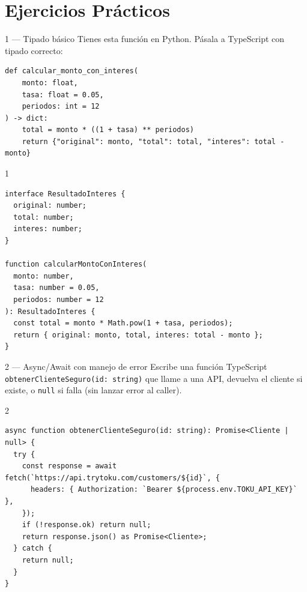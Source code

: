 \documentclass[11pt,a4paper]{article}
\begin{document}
\section{Ejercicios Prácticos}

\begin{ejerciciobox}{1 — Tipado básico}
Tienes esta función en Python. Pásala a TypeScript con tipado correcto:
\begin{lstlisting}[style=python]
def calcular_monto_con_interes(
    monto: float,
    tasa: float = 0.05,
    periodos: int = 12
) -> dict:
    total = monto * ((1 + tasa) ** periodos)
    return {"original": monto, "total": total, "interes": total - monto}
\end{lstlisting}
\end{ejerciciobox}

\begin{solucionbox}{1}
\begin{lstlisting}[style=typescript]
interface ResultadoInteres {
  original: number;
  total: number;
  interes: number;
}

function calcularMontoConInteres(
  monto: number,
  tasa: number = 0.05,
  periodos: number = 12
): ResultadoInteres {
  const total = monto * Math.pow(1 + tasa, periodos);
  return { original: monto, total, interes: total - monto };
}
\end{lstlisting}
\end{solucionbox}

\begin{ejerciciobox}{2 — Async/Await con manejo de error}
Escribe una función TypeScript \texttt{obtenerClienteSeguro(id: string)} que llame a una API,
devuelva el cliente si existe, o \texttt{null} si falla (sin lanzar error al caller).
\end{ejerciciobox}

\begin{solucionbox}{2}
\begin{lstlisting}[style=typescript]
async function obtenerClienteSeguro(id: string): Promise<Cliente | null> {
  try {
    const response = await fetch(`https://api.trytoku.com/customers/${id}`, {
      headers: { Authorization: `Bearer ${process.env.TOKU_API_KEY}` },
    });
    if (!response.ok) return null;
    return response.json() as Promise<Cliente>;
  } catch {
    return null;
  }
}
\end{lstlisting}
\end{solucionbox}
\end{document}
